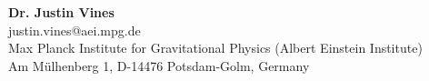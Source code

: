 \documentclass[11pt,a4paper,sans]{moderncv}        %
\begin{document}
        \vspace{7pt}
    
    \textbf{Dr. Justin Vines}\\
    justin.vines@aei.mpg.de\\
    Max Planck Institute for Gravitational Physics (Albert Einstein Institute)\\
    Am Mülhenberg 1, D-14476 Potsdam-Golm, Germany
    
%	
	
	

	
	
\end{document}
